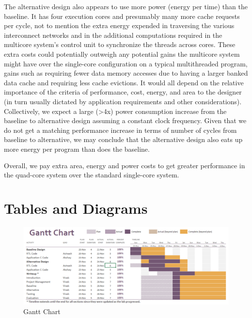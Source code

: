\documentclass[10pt]{article}
\begin{document}
The alternative design also appears to use more power (energy per time) than the baseline. It has four execution cores and presumably many more cache requests per cycle, not to mention the extra energy expended in traversing the various interconnect networks and in the additional computations required in the multicore system's control unit to synchronize the threads across cores. These extra costs could potentially outweigh any potential gains the multicore system might have over the single-core configuration on a typical multithreaded program, gains such as requiring fewer data memory accesses due to having a larger banked data cache and requiring less cache evictions. It would all depend on the relative importance of the criteria of performance, cost, energy, and area to the designer (in turn usually dictated by application requirements and other considerations). Collectively, we expect a large (>4x) power consumption increase from the baseline to alternative design assuming a constant clock frequency. Given that we do not get a matching performance increase in terms of number of cycles from baseline to alternative, we may conclude that the alternative design also eats up more energy per program than does the baseline.

Overall, we pay extra area, energy and power costs to get greater performance in the quad-core system over the standard single-core system.



\newpage
\section {Tables and Diagrams}

\begin{figure}[H]
	\centering
	\includegraphics[scale=0.7, angle=90]{gantt}
	\caption{Gantt Chart}
	\label{fig:gantt}
\end{figure}
\end{document}

